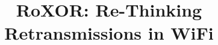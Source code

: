 \documentclass{sig-alternate}
\begin{document}
\newcommand{\roxor}{RoXOR}
\title{\roxor: Re-Thinking Retransmissions in WiFi}
\maketitle










{
\small
{}
}
%
\end{document}

